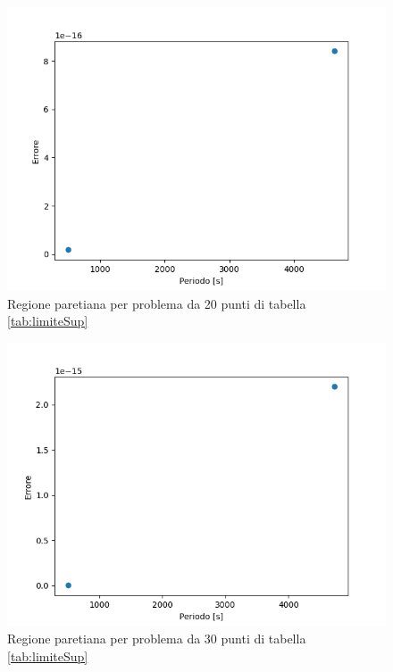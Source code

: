 \documentclass[a4paper,12pt]{report}
\begin{document}
\begin{itemize}
  \begin{figure}[H]
    \centering
    \includegraphics[scale=0.70]{img/puls0013/standard20.png}
    \caption{Regione paretiana per problema da 20 punti di tabella \ref{tab:limiteSup}}
    \label{fig:reg_ammis_20_0013_std}
  \end{figure}

  \begin{figure}[H]
    \centering
    \includegraphics[scale=0.70]{img/puls0013/standard30.png}
    \caption{Regione paretiana per problema da 30 punti di tabella \ref{tab:limiteSup}}
    \label{fig:reg_ammis_30_0013_std}
  \end{figure}



\end{itemize}
\end{document}
